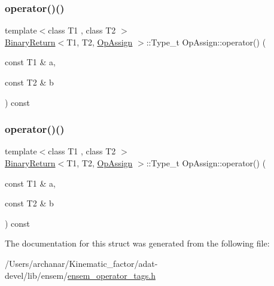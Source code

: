 \mbox{\label{structOpAssign_a1fec7678b3c8924f7bac6a4feb4eb3d0}} 
\subsubsection{\texorpdfstring{operator()()}{operator()()}\hspace{0.1cm}{\footnotesize\ttfamily [2/3]}}
{\footnotesize\ttfamily template$<$class T1 , class T2 $>$ \\
\mbox{\hyperlink{structBinaryReturn}{Binary\+Return}}$<$T1, T2, \mbox{\hyperlink{structOpAssign}{Op\+Assign}} $>$\+::Type\+\_\+t Op\+Assign\+::operator() (\begin{DoxyParamCaption}\item[{const T1 \&}]{a,  }\item[{const T2 \&}]{b }\end{DoxyParamCaption}) const\hspace{0.3cm}{\ttfamily [inline]}}

\mbox{\label{structOpAssign_a1fec7678b3c8924f7bac6a4feb4eb3d0}} 
\subsubsection{\texorpdfstring{operator()()}{operator()()}\hspace{0.1cm}{\footnotesize\ttfamily [3/3]}}
{\footnotesize\ttfamily template$<$class T1 , class T2 $>$ \\
\mbox{\hyperlink{structBinaryReturn}{Binary\+Return}}$<$T1, T2, \mbox{\hyperlink{structOpAssign}{Op\+Assign}} $>$\+::Type\+\_\+t Op\+Assign\+::operator() (\begin{DoxyParamCaption}\item[{const T1 \&}]{a,  }\item[{const T2 \&}]{b }\end{DoxyParamCaption}) const\hspace{0.3cm}{\ttfamily [inline]}}



The documentation for this struct was generated from the following file\+:\begin{DoxyCompactItemize}
\item 
/\+Users/archanar/\+Kinematic\+\_\+factor/adat-\/devel/lib/ensem/\mbox{\hyperlink{adat-devel_2lib_2ensem_2ensem__operator__tags_8h}{ensem\+\_\+operator\+\_\+tags.\+h}}\end{DoxyCompactItemize}
